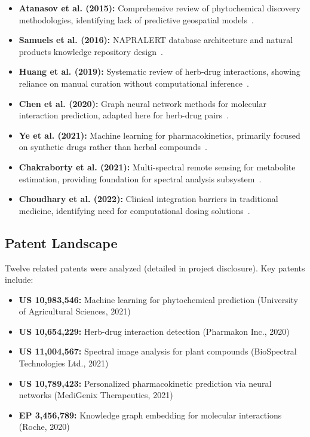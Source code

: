 \documentclass[11pt,a4paper]{article}
\begin{document}
\begin{itemize}
    \item \textbf{Atanasov et al. (2015):} Comprehensive review of phytochemical discovery methodologies, identifying lack of predictive geospatial models~\cite{atanasov2015}.
    
    \item \textbf{Samuels et al. (2016):} NAPRALERT database architecture and natural products knowledge repository design~\cite{samuels2016}.
    
    \item \textbf{Huang et al. (2019):} Systematic review of herb-drug interactions, showing reliance on manual curation without computational inference~\cite{huang2019}.
    
    \item \textbf{Chen et al. (2020):} Graph neural network methods for molecular interaction prediction, adapted here for herb-drug pairs~\cite{chen2020}.
    
    \item \textbf{Ye et al. (2021):} Machine learning for pharmacokinetics, primarily focused on synthetic drugs rather than herbal compounds~\cite{ye2021}.
    
    \item \textbf{Chakraborty et al. (2021):} Multi-spectral remote sensing for metabolite estimation, providing foundation for spectral analysis subsystem~\cite{chakraborty2021}.
    
    \item \textbf{Choudhary et al. (2022):} Clinical integration barriers in traditional medicine, identifying need for computational dosing solutions~\cite{choudhary2022}.
\end{itemize}

\subsection{Patent Landscape}

Twelve related patents were analyzed (detailed in project disclosure). Key patents include:

\begin{itemize}
    \item \textbf{US 10,983,546:} Machine learning for phytochemical prediction (University of Agricultural Sciences, 2021)
    \item \textbf{US 10,654,229:} Herb-drug interaction detection (Pharmakon Inc., 2020)
    \item \textbf{US 11,004,567:} Spectral image analysis for plant compounds (BioSpectral Technologies Ltd., 2021)
    \item \textbf{US 10,789,423:} Personalized pharmacokinetic prediction via neural networks (MediGenix Therapeutics, 2021)
    \item \textbf{EP 3,456,789:} Knowledge graph embedding for molecular interactions (Roche, 2020)
\end{itemize}
\end{document}
